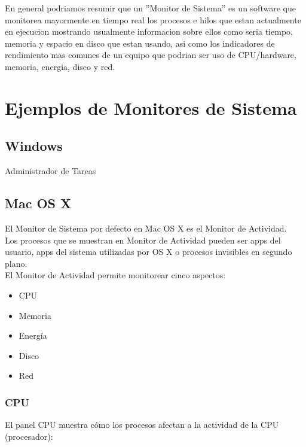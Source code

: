 \documentclass[a4paper,11pt]{article}
\begin{document}
En general podriamos resumir que un ''Monitor de Sistema'' es un software que monitorea mayormente en tiempo real los procesos e hilos que estan actualmente en ejecucion mostrando usualmente informacion sobre ellos como seria tiempo, memoria y espacio en disco que estan usando, asi como los indicadores de rendimiento mas comunes de un equipo que podrian ser uso de CPU/hardware, memoria, energia, disco y red.

\section{Ejemplos de Monitores de Sistema}

\subsection{Windows}

Administrador de Tareas

\subsection{Mac OS X}

El Monitor de Sistema por defecto en Mac OS X es el Monitor de Actividad.\\

Los procesos que se muestran en Monitor de Actividad pueden ser apps del usuario, apps del sistema utilizadas por OS X o procesos invisibles en segundo plano.\\

El Monitor de Actividad permite monitorear cinco aspectos:
\begin{itemize}
  \item CPU
  \item Memoria
  \item Energía
  \item Disco
  \item Red
\end{itemize}

\subsubsection{CPU}

El panel CPU muestra cómo los procesos afectan a la actividad de la CPU (procesador):
\end{document}
